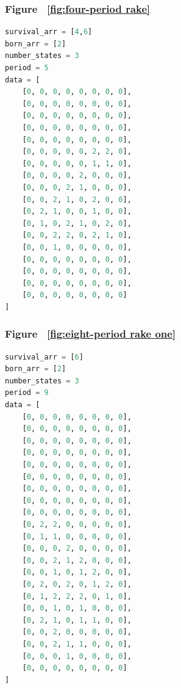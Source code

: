 \documentclass[12pt]{article}
\numberwithin{figure}{section} %
\begin{document}
\subsubsection{Figure ~\ref{fig:four-period rake}}
\label{subsubsection:four-period rake}
\begin{lstlisting}[language = Python]
survival_arr = [4,6]
born_arr = [2]
number_states = 3
period = 5
data = [
    [0, 0, 0, 0, 0, 0, 0, 0],
    [0, 0, 0, 0, 0, 0, 0, 0],
    [0, 0, 0, 0, 0, 0, 0, 0],
    [0, 0, 0, 0, 0, 0, 0, 0],
    [0, 0, 0, 0, 0, 0, 0, 0],
    [0, 0, 0, 0, 0, 2, 2, 0],
    [0, 0, 0, 0, 0, 1, 1, 0],
    [0, 0, 0, 0, 2, 0, 0, 0],
    [0, 0, 0, 2, 1, 0, 0, 0],
    [0, 0, 2, 1, 0, 2, 0, 0],
    [0, 2, 1, 0, 0, 1, 0, 0],
    [0, 1, 0, 2, 1, 0, 2, 0],
    [0, 0, 2, 2, 0, 2, 1, 0],
    [0, 0, 1, 0, 0, 0, 0, 0],
    [0, 0, 0, 0, 0, 0, 0, 0],
    [0, 0, 0, 0, 0, 0, 0, 0],
    [0, 0, 0, 0, 0, 0, 0, 0],
    [0, 0, 0, 0, 0, 0, 0, 0]
]
\end{lstlisting}
\subsubsection{Figure ~\ref{fig:eight-period rake one}}
\label{subsubsection:eight-period rake one}
\begin{lstlisting}[language = Python]
survival_arr = [6]
born_arr = [2]
number_states = 3
period = 9
data = [
    [0, 0, 0, 0, 0, 0, 0, 0],
    [0, 0, 0, 0, 0, 0, 0, 0],
    [0, 0, 0, 0, 0, 0, 0, 0],
    [0, 0, 0, 0, 0, 0, 0, 0],
    [0, 0, 0, 0, 0, 0, 0, 0],
    [0, 0, 0, 0, 0, 0, 0, 0],
    [0, 0, 0, 0, 0, 0, 0, 0],
    [0, 0, 0, 0, 0, 0, 0, 0],
    [0, 0, 0, 0, 0, 0, 0, 0],
    [0, 2, 2, 0, 0, 0, 0, 0],
    [0, 1, 1, 0, 0, 0, 0, 0],
    [0, 0, 0, 2, 0, 0, 0, 0],
    [0, 0, 2, 1, 2, 0, 0, 0],
    [0, 0, 1, 0, 1, 2, 0, 0],
    [0, 2, 0, 2, 0, 1, 2, 0],
    [0, 1, 2, 2, 2, 0, 1, 0],
    [0, 0, 1, 0, 1, 0, 0, 0],
    [0, 2, 1, 0, 1, 1, 0, 0],
    [0, 0, 2, 0, 0, 0, 0, 0],
    [0, 0, 2, 1, 1, 0, 0, 0],
    [0, 0, 0, 1, 0, 0, 0, 0],
    [0, 0, 0, 0, 0, 0, 0, 0]
]
\end{lstlisting}
\end{document}
